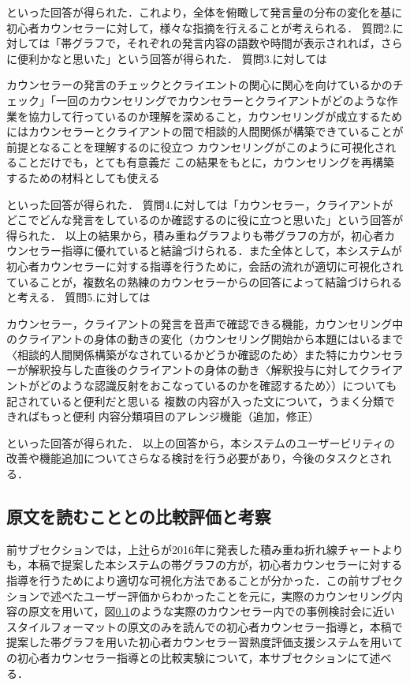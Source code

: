 \documentclass[shuuron]{kuee}
\begin{document}
といった回答が得られた．これより，全体を俯瞰して発言量の分布の変化を基に初心者カウンセラーに対して，様々な指摘を行えることが考えられる．
質問2.に対しては「帯グラフで，それぞれの発言内容の語数や時間が表示されれば，さらに便利かなと思いた」という回答が得られた．
質問3.に対しては

カウンセラーの発言のチェックとクライエントの関心に関心を向けているかのチェック」「一回のカウンセリングでカウンセラーとクライアントがどのような作業を協力して行っているのか理解を深めること，カウンセリングが成立するためにはカウンセラーとクライアントの間で相談的人間関係が構築できていることが前提となることを理解するのに役立つ
カウンセリングがこのように可視化されることだけでも，とても有意義だ
この結果をもとに，カウンセリングを再構築するための材料としても使える

といった回答が得られた．
質問4.に対しては「カウンセラー，クライアントがどこでどんな発言をしているのか確認するのに役に立つと思いた」という回答が得られた．
以上の結果から，積み重ねグラフよりも帯グラフの方が，初心者カウンセラー指導に優れていると結論づけられる．また全体として，本システムが初心者カウンセラーに対する指導を行うために，会話の流れが適切に可視化されていることが，複数名の熟練のカウンセラーからの回答によって結論づけられると考える．
質問5.に対しては

カウンセラー，クライアントの発言を音声で確認できる機能，カウンセリング中のクライアントの身体の動きの変化（カウンセリング開始から本題にはいるまで〈相談的人間関係構築がなされているかどうか確認のため〉また特にカウンセラーが解釈投与した直後のクライアントの身体の動き〈解釈投与に対してクライアントがどのような認識反射をおこなっているのかを確認するため〉）についても記されていると便利だと思いる
複数の内容が入った文について，うまく分類できればもっと便利
内容分類項目のアレンジ機能（追加，修正）



といった回答が得られた．
以上の回答から，本システムのユーザービリティの改善や機能追加についてさらなる検討を行う必要があり，今後のタスクとされる．

\subsection{原文を読むこととの比較評価と考察}%




前サブセクションでは，上辻ら\cite{uetsuji}が2016年に発表した積み重ね折れ線チャートよりも，本稿で提案した本システムの帯グラフの方が，初心者カウンセラーに対する指導を行うためにより適切な可視化方法であることが分かった．この前サブセクションで述べたユーザー評価からわかったことを元に，実際のカウンセリング内容の原文を用いて，図\ref{}のような実際のカウンセラー内での事例検討会に近いスタイルフォーマットの原文のみを読んでの初心者カウンセラー指導と，本稿で提案した帯グラフを用いた初心者カウンセラー習熟度評価支援システムを用いての初心者カウンセラー指導との比較実験について，本サブセクションにて述べる．
\end{document}
